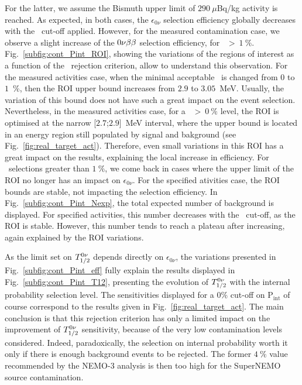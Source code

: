 For the latter, we assume the Bismuth upper limit of $290~\mu$Bq/kg activity is reached.
As expected, in both cases, the $\epsilon_{0\nu}$ selection efficiency globally decreases with the \Pint\ cut-off applied.
However, for the measured contamination case, we observe a slight increase of the $0\nu\beta\beta$ selection efficiency, for \Pint\ $>~1~\%$.
Fig.~\ref{subfig:cont_Pint_ROI}, showing the variations of the regions of interest as a function of the \Pint\ rejection criterion, allow to understand this observation.
For the measured activities case, when the minimal acceptable \Pint\ is changed from $0$ to $1$~\%, then the ROI upper bound increases from $2.9$ to $3.05$~MeV.
Usually, the variation of this bound does not have such a great impact on the event selection.
Nevertheless, in the measured activities case, for a \Pint~$>~0~\%$ level, the ROI is optimised at the narrow [$2.7$;$2.9$]~MeV interval, where the upper bound is located in an energy region still populated by signal and bakground (see Fig.~\ref{fig:real_target_act}).
Therefore, even small variations in this ROI has a great impact on the results, explaining the local increase in efficiency.
For \Pint\ selections greater than $1~\%$, we come back in cases where the upper limit of the ROI no longer has an impact on $\epsilon_{0\nu}$.
For the specified ativities case, the ROI bounds are stable, not impacting the selection efficiency.
In Fig.~\ref{subfig:cont_Pint_Nexp}, the total expected number of background is displayed.
For specified activities, this number decreases with the \Pint\ cut-off, as the ROI is stable.
However, this number tends to reach a plateau after increasing, again explained by the ROI variations.

As the limit set on $T_{1/2}^{0\nu}$ depends directly on $\epsilon_{0\nu}$, the variations presented in Fig.~\ref{subfig:cont_Pint_eff} fully explain the results displayed in Fig.~\ref{subfig:cont_Pint_T12}, presenting the evolution of $T_{1/2}^{0\nu}$ with the internal probability selection level.
The sensitivities displayed for a $0\%$ cut-off on P$_{\text{int}}$ of course correspond to the results given in Fig.~\ref{fig:real_target_act}.
The main conclusion is that this rejection criterion has only a limited impact on the improvement of $T_{1/2}^{0\nu}$ sensitivity, because of the very low contamination levels considered.
Indeed, paradoxically, the selection on internal probability worth it only if there is enough background events to be rejected.
The former $4~\%$ value recommended by the NEMO-$3$ analysis is then too high for the SuperNEMO source contamination.

